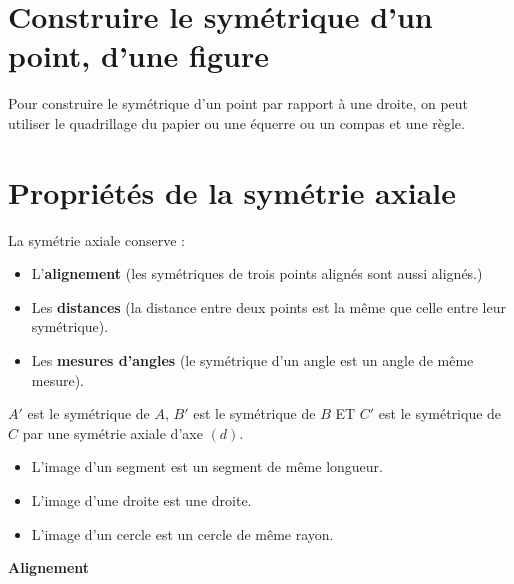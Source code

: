 \begin{pageCours}

\section{Construire le symétrique d'un point, d'une figure}

\begin{Mt}
Pour construire le symétrique d'un point par rapport à une droite, on peut utiliser le quadrillage du papier ou une équerre ou un compas et une règle.
\end{Mt}

\section{Propriétés de la symétrie axiale}

 
\begin{Pp}
La symétrie axiale conserve :
\begin{itemize}
\item L'\textbf{alignement} (les symétriques de trois points alignés sont aussi alignés.)
\item Les \textbf{distances} (la distance entre deux points est la même que celle entre leur symétrique).
\item Les \textbf{mesures d'angles} (le symétrique d'un angle est un angle de même mesure).
\end{itemize}
\end{Pp} 
 
\begin{Cq}
$A'$ est le symétrique de $A$, $B'$ est le symétrique de $B$ ET $C'$ est le symétrique de $C$ par une symétrie axiale d'axe $(d)$. 
\begin{itemize}
\item L'image d'un segment est un segment de même longueur.
\item L'image d'une droite est une droite.
\item L'image d'un cercle est un cercle de même rayon.
\end{itemize}

\begin{minipage}[c]{.3\linewidth}
\begin{center}
\textbf{Alignement}


\end{center}
\end{minipage}
\end{Cq}
\end{pageCours}
